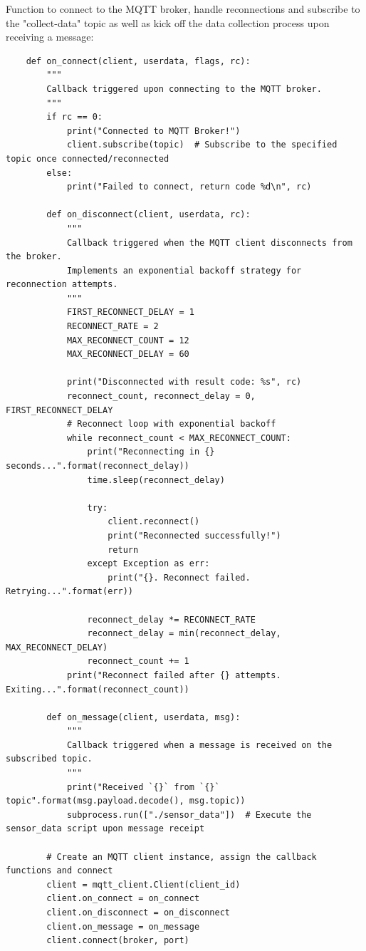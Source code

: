 Function to connect to the MQTT broker, handle reconnections and subscribe to the "collect-data" topic as well as kick off the data collection process upon receiving a message:
\begin{verbatim}
    def on_connect(client, userdata, flags, rc):
        """
        Callback triggered upon connecting to the MQTT broker.
        """
        if rc == 0:
            print("Connected to MQTT Broker!")
            client.subscribe(topic)  # Subscribe to the specified topic once connected/reconnected
        else:
            print("Failed to connect, return code %d\n", rc)
        
        def on_disconnect(client, userdata, rc):
            """
            Callback triggered when the MQTT client disconnects from the broker.
            Implements an exponential backoff strategy for reconnection attempts.
            """
            FIRST_RECONNECT_DELAY = 1
            RECONNECT_RATE = 2
            MAX_RECONNECT_COUNT = 12
            MAX_RECONNECT_DELAY = 60

            print("Disconnected with result code: %s", rc)
            reconnect_count, reconnect_delay = 0, FIRST_RECONNECT_DELAY
            # Reconnect loop with exponential backoff
            while reconnect_count < MAX_RECONNECT_COUNT:
                print("Reconnecting in {} seconds...".format(reconnect_delay))
                time.sleep(reconnect_delay)

                try:
                    client.reconnect()
                    print("Reconnected successfully!")
                    return
                except Exception as err:
                    print("{}. Reconnect failed. Retrying...".format(err))

                reconnect_delay *= RECONNECT_RATE
                reconnect_delay = min(reconnect_delay, MAX_RECONNECT_DELAY)
                reconnect_count += 1
            print("Reconnect failed after {} attempts. Exiting...".format(reconnect_count))

        def on_message(client, userdata, msg):
            """
            Callback triggered when a message is received on the subscribed topic.
            """
            print("Received `{}` from `{}` topic".format(msg.payload.decode(), msg.topic))
            subprocess.run(["./sensor_data"])  # Execute the sensor_data script upon message receipt

        # Create an MQTT client instance, assign the callback functions and connect
        client = mqtt_client.Client(client_id)
        client.on_connect = on_connect
        client.on_disconnect = on_disconnect
        client.on_message = on_message
        client.connect(broker, port)
\end{verbatim}

